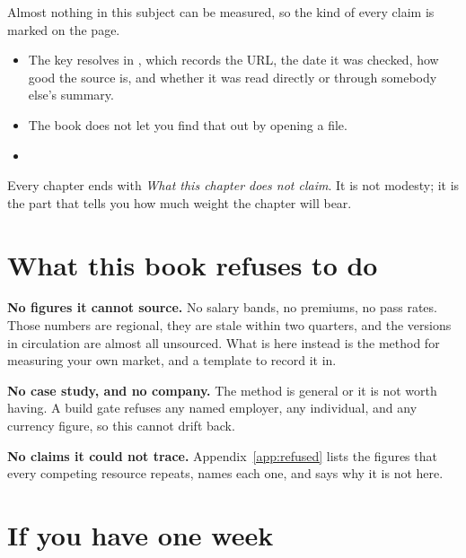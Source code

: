 Almost nothing in this subject can be measured, so the kind of every claim is
marked on the page.

\begin{itemize}
  \item {} The key resolves in
        , which records the URL, the date it was checked,
        how good the source is, and whether it was read directly or through
        somebody else's summary.
  \item {} The book does not let you find
        that out by opening a file.
  \item {}
\end{itemize}

Every chapter ends with \emph{What this chapter does not claim}. It is not
modesty; it is the part that tells you how much weight the chapter will bear.

\section*{What this book refuses to do}

\textbf{No figures it cannot source.} No salary bands, no premiums, no pass
rates. Those numbers are regional, they are stale within two quarters, and the
versions in circulation are almost all unsourced. What is here instead is the
method for measuring your own market, and a template to record it in.

\textbf{No case study, and no company.} The method is general or it is not
worth having. A build gate refuses any named employer, any individual, and any
currency figure, so this cannot drift back.

\textbf{No claims it could not trace.} Appendix~\ref{app:refused} lists the
figures that every competing resource repeats, names each one, and says why it
is not here. 

\section*{If you have one week}

